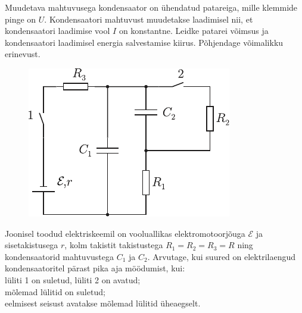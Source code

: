 \documentclass[10pt]{article}
\begin{document}
{%

Muudetava mahtuvusega kondensaator on ühendatud patareiga,
mille klemmide pinge on $U$. Kondensaatori mahtuvust muudetakse laadimisel nii, et
kondensaatori laadimise vool $I$ on konstantne. Leidke patarei võimsus ja kondensaatori laadimisel energia salvestamise kiirus.
Põhjendage võimalikku erinevust.
\probend
\bigskip


\begin{figure}
	\begin{center}
		\vspace{-25pt}
		\includegraphics[width=\linewidth]{2006-v2g-07-yl}
	\end{center}
\end{figure}
Joonisel toodud elektriskeemil on vooluallikas elektromotoorjõuga $\mathcal E$ ja sisetakistusega $r$, kolm takistit takistustega $R_1 = R_2 = R_3 = R$ ning kondensaatorid mahtuvustega $C_1$ ja $C_2$. Arvutage, kui suured on elektrilaengud kondensaatoritel pärast pika aja möödumist, kui:\\
\osa lüliti 1 on suletud, lüliti 2 on avatud;\\
\osa mõlemad lülitid on suletud;\\
\osa eelmisest seisust avatakse mõlemad lülitid üheaegselt.
\probend
\newpage

}
\end{document}
